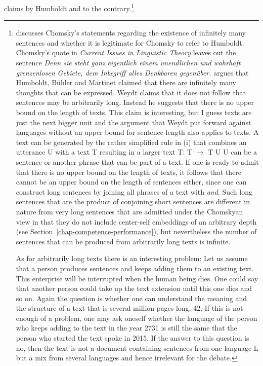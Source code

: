 claims by Humboldt and \citet[]{Chomsky2008a} to the contrary.\footnote{
  \citet{Weydt72a} discusses Chomsky's statements regarding the existence of infinitely many
  sentences and whether it is legitimate for Chomsky to refer to Humboldt. Chomsky's quote in
  \emph{Current Issues in Linguistic Theory} \citep[]{Chomsky70b-ut} leaves out the sentence \emph{Denn sie steht ganz eigentlich einem unendlichen und
    wahrhaft grenzenlosen Gebiete, dem Inbegriff alles Denkbaren gegenüber.} \citet[]{Weydt72a} argues that
  Humboldt, Bühler and Martinet claimed that
  there are infinitely many thoughts that can be expressed. Weydt
  claims that it does not follow that sentences may be arbitrarily long. Instead he suggests that
  there is no upper bound on the length of texts. This claim is interesting, but I guess texts are
  just the next bigger unit and the argument that Weydt put forward against languages without an
  upper bound for sentence length also applies to texts. A text can be generated by the rather
  simplified rule in (i) that combines an utterance U with a text T resulting in a larger text T:
  \ea
  T $\to$ T U
  \z
  U can be a sentence or another phrase that can be part of a text. If one is ready to admit that
  there is no upper bound on the length of texts, it follows that there cannot be an upper bound on
  the length of sentences either, since one can construct long sentences by joining all phrases of a
  text with \emph{and}. Such long sentences that are the product of conjoining short sentences are different in nature from very long sentences that are admitted under the
  Chomskyan view in that they do not include center-self embeddings of an
  arbitrary depth (see Section~\ref{chap-competence-performance}), but nevertheless the number of
  sentences that can be produced from arbitrarily long texts is infinite.

  As for arbitrarily long texts there is an interesting problem: Let us assume that a person
  produces sentences and keeps adding them to an existing text. This enterprise will be interrupted
  when the human being dies. One could say that another person could take up the text extension
  until this one dies and so on. Again the question is whether one can understand the meaning and the structure
  of a text that is several million pages long. 42. If this is not enough of a problem, one may ask
  oneself whether the language of the person who keeps adding to the text in the year 2731 is still
  the same that the person who started the text spoke in 2015. If the answer to this question is no,
  then the text is not a document containing sentences from one language L but a mix from several
  languages and hence irrelevant for the debate. 
} 

